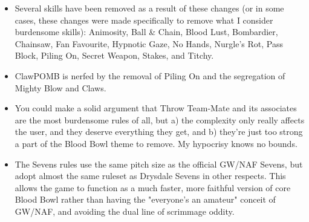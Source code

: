 \documentclass{article}
\begin{document}
\begin{multicols}{2}
\begin{itemize}
\item Several skills have been removed as a result of these changes (or in some cases, these changes were made specifically to remove what I consider burdensome skills): Animosity, Ball \& Chain, Blood Lust, Bombardier, Chainsaw, Fan Favourite, Hypnotic Gaze, No Hands, Nurgle's Rot, Pass Block, Piling On, Secret Weapon, Stakes, and Titchy.
\item ClawPOMB is nerfed by the removal of Piling On and the segregation of Mighty Blow and Claws.
\item You could make a solid argument that Throw Team-Mate and its associates are the most burdensome rules of all, but a) the complexity only really affects the user, and they deserve everything they get, and b) they're just too strong a part of the Blood Bowl theme to remove. My hypocrisy knows no bounds.
\item The Sevens rules use the same pitch size as the official GW/NAF Sevens, but adopt almost the same ruleset as Drysdale Sevens in other respects. This allows the game to function as a much faster, more faithful version of core Blood Bowl rather than having the "everyone's an amateur" conceit of GW/NAF, and avoiding the dual line of scrimmage oddity.
\end{itemize}

\end{multicols}
\end{document}
